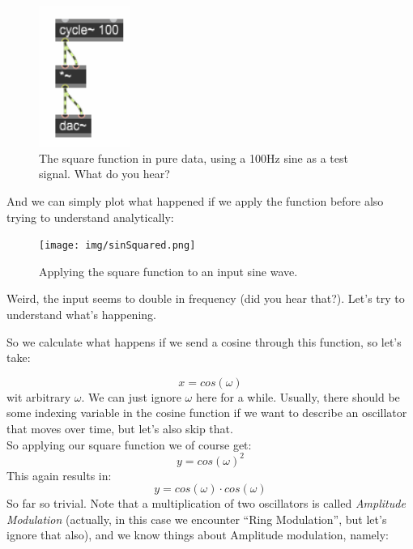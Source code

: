 \begin{figure}[H]
	\begin{center}
		\includegraphics[width = 3cm]{img/pd_square.png}
		\caption{The square function in pure data, using a 100Hz sine as a test signal. What do you hear?}
		\label{fig:squarePd}
	\end{center}
\end{figure}



And we can simply plot what happened if we apply the function before also trying to understand analytically:


\begin{figure}[H]
	\begin{center}
		\texttt{[image: img/sinSquared.png]}
		\caption{Applying the square function to an input sine wave.}
		\label{fig:sinSquared}
	\end{center}
\end{figure}


Weird, the input seems to double in frequency (did you hear that?). Let's try to understand what's happening.\

So we calculate what happens if we send a cosine through this function, so let's take:

\begin{equation}
x = cos(\omega)
\end{equation}
wit arbitrary $\omega$. We can just ignore $\omega$ here for a while. Usually, there should be some indexing variable in the cosine function if we want to describe an oscillator that moves over time, but let's also skip that.\\
So applying our square function we of course get:
\begin{equation}
y = cos(\omega)^2
\end{equation}
This again results in:
\begin{equation}
y = cos(\omega) \cdot cos(\omega)
\end{equation}
So far so trivial. Note that a multiplication of two oscillators is called \textit{Amplitude Modulation} (actually, in this case we encounter ``Ring Modulation'', but let's ignore that also), and we know things about Amplitude modulation, namely:\

